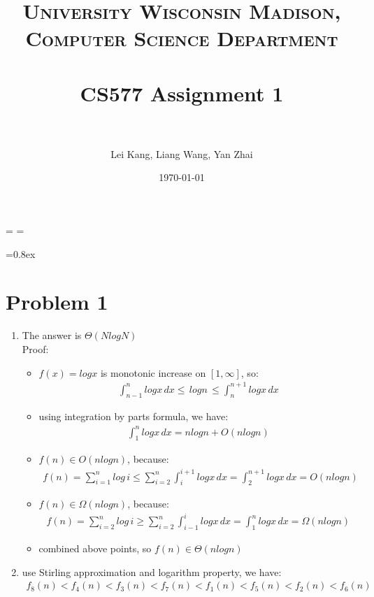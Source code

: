 \documentclass[paper=a4, fontsize=11pt]{scrartcl} %
\title{	
\normalfont \normalsize 
\textsc{University Wisconsin Madison, Computer Science Department} \\ [25pt] %
\horrule{0.5pt} \\[0.4cm] %
\huge CS577 Assignment 1\\ %
\horrule{2pt} \\[0.5cm] %
}
\author{Lei Kang, Liang Wang, Yan Zhai} %
\date{\normalsize\today} %
\numberwithin{equation}{section} %
\numberwithin{figure}{section} %
\numberwithin{table}{section} %
\begin{document}
\maketitle %

\singlespacing
\newdimen\origiwspc%
\newdimen\origiwstr%
\origiwspc=\font%
\origiwstr=\font

\font=0.8ex

\section*{Problem 1}

\begin{enumerate}[label={1.\arabic*}]
  \item The answer is $\Theta(NlogN)$\\
    Proof:
    \begin{itemize}
      \item $f(x)=log x$ is monotonic increase on $[1,\infty]$, so:
	\begin{align*}
	  \int^{n}_{n-1}log x\,dx \leq\,log n\,\leq \int^{n+1}_{n}log x\,dx
	\end{align*}

      \item using integration by parts formula, we have:
	\begin{align*}
	  \int^{n}_{1}log x\,dx = n log n + O(n log n)
	\end{align*}

      \item $f(n) \in O(n log n)$, because:
	\begin{align*}
	  f(n) = \sum_{i=1}^{n}log\,i 
	       \leq \sum_{i=2}^{n}\int^{i+1}_{i} log x\,dx
	       = \int^{n+1}_{2}log x\,dx
	       = O(n log n)
      	\end{align*}
      \item $f(n) \in \Omega(n log n)$, because:
	\begin{align*}
	  f(n) = \sum_{i=2}^{n}log\,i
	       \geq \sum_{i=2}^{n}\int^{i}_{i-1} log x\,dx
	       = \int^{n}_{1}log x\,dx
	       = \Omega(n log n)
      	\end{align*}
      \item combined above points, so $f(n) \in \Theta(n log n)$
    \end{itemize}

  \item use Stirling approximation and logarithm property, we have:
    \begin{align*}
      f_8(n) < f_4(n) < f_3(n) < f_7(n) < f_1(n) < f_5(n) < f_2(n) < f_6(n)
    \end{align*}

\end{enumerate}
\end{document}
